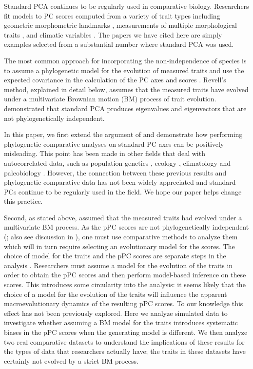 \documentclass[a4paper,11pt]{article}
\begin{document}
Standard PCA continues to be regularly used in comparative biology. Researchers fit models to PC scores computed from a variety of trait types including geometric morphometric landmarks \citep[e.g.,][]{Dornburg2011, Hunt2013}, measurements of multiple morphological traits \citep[e.g.,][]{Harmon2010, Weir2012, Pienaar2013, Price2014}, and climatic variables \citep[e.g.,][]{KozakWiens2010, Schnitzler2012}. The papers we have cited here are simply examples selected from a substantial number where standard PCA was used.

The most common approach for incorporating the non-independence of species is to assume a phylogenetic model for the evolution of measured traits and use the expected covariance in the calculation of the PC axes and scores \citep[phylogenetic principal components analysis, or pPCA;][]{Revell2008}. Revell's method, explained in detail below, assumes that the measured traits have evolved under a multivariate Brownian motion (BM) process of trait evolution. \citet{Revell2008} demonstrated that standard PCA produces eigenvalues and eigenvectors that are not phylogenetically independent. 

In this paper, we first extend the argument of \citet{Revell2008} and demonstrate how performing phylogenetic comparative analyses on standard PC axes can be positively misleading. This point has been made in other fields that deal with autocorrelated data, such as population genetics \citep{Novembre}, ecology \citep{Podani2002}, climatology \citep{Richman1986} and paleobiology \citep{Bookstein2012}. However, the connection between these previous results and phylogenetic comparative data has not been widely appreciated and standard PCs continue to be regularly used in the field. We hope our paper helps change this practice.

Second, as stated above, \citet{Revell2008} assumed that the measured traits had evolved under a multivariate BM process. As the pPC scores are not phylogenetically independent (\citealp{Revell2008}; also see discussion in \citealp{Polly2013}), one must use comparative methods to analyze them which will in turn require selecting an evolutionary model for the scores. The choice of model for the traits and the pPC scores are separate steps in the analysis \citep{Revell2008}. Researchers must assume a model for the evolution of the traits in order to obtain the pPC scores and then perform model-based inference on these scores. This introduces some circularity into the analysis: it seems likely that the choice of a model for the evolution of the traits will influence the apparent macroevolutionary dynamics of the resulting pPC scores. To our knowledge this effect has not been previously explored. Here we analyze simulated data to investigate whether assuming a BM model for the traits introduces systematic biases in the pPC scores when the generating model is different. We then analyze two real comparative datasets to understand the implications of these results for the types of data that researchers actually have; the traits in these datasets have certainly not evolved by a strict BM process.
\end{document}
